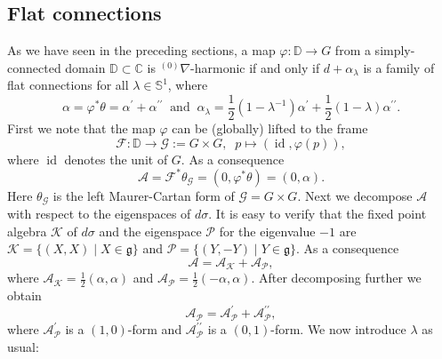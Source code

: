 \documentclass[12pt]{amsart}
\theoremstyle{definition}
\theoremstyle{remark}
\numberwithin{equation}{section}
\begin{document}
\subsection{Flat connections}
 As we have seen in the preceding sections, a map 
 $\varphi : \mathbb D  \to G$ from a simply-connected 
 domain  $\mathbb D \subset \mathbb C$ is ${{}^{(0)}\nabla}$-harmonic 
 if and only if $d + \alpha_{\lambda}$ is a family of 
 flat connections for all $\lambda \in \mathbb S^1$, 
 where 
\begin{equation}\label{eq:alphalambda}
 \alpha =\varphi^{*}\theta  = \alpha^{\prime} + \alpha^{\prime \prime}\;\; \mbox{and} \;\;
 \alpha_{\lambda} = \frac{1}{2}(1- \lambda^{-1}) \alpha^{\prime}+ 
 \frac{1}{2}(1- \lambda) \alpha^{\prime \prime}.
\end{equation}
 First we note that the map $\varphi$ can be (globally) lifted to the frame 
\begin{equation*}
 \mathcal F : \mathbb D \to {\mathcal G}:=G \times G, 
 \;\; p \mapsto ({\operatorname{id}}, \varphi(p)),
\end{equation*}
 where ${\operatorname{id}}$ denotes the unit of $G$.
 As a consequence 
\begin{equation}\label{eq:doubleMC}
 \mathcal A =\mathcal F^{*}\theta_{\mathcal{G}}  = 
 (0,  \varphi^{*}\theta)  = ( 0, \alpha).
\end{equation}
 Here $\theta_{\mathcal G}$ is the left Maurer-Cartan 
 form of $\mathcal{G}=G\times{G}$.
 Next we decompose $\mathcal A$ with respect to the eigenspaces
 of $d \sigma$. It is easy to verify that the fixed point algebra $\mathcal K$ 
 of $d \sigma$ and the eigenspace $\mathcal P$ 
 for the eigenvalue $-1$ are 
 ${\mathcal K} = \{(X, X)\;|\; X \in \mathfrak g\}$ and 
 ${\mathcal P} = \{(Y, -Y)\;|\; Y \in \mathfrak g\}$.
 As a consequence 
\begin{equation*}
 {\mathcal A} = {\mathcal A}_{\mathcal K} +  {\mathcal A}_{\mathcal P},
\end{equation*}
 where ${\mathcal A}_{\mathcal K}= \tfrac{1}{2}(\alpha, \alpha)$
 and ${\mathcal A}_{\mathcal P} = \tfrac{1}{2}(-\alpha, \alpha)$.
 After decomposing further we obtain
\begin{equation*}
 {\mathcal A}_{\mathcal P} 
 = {\mathcal A}_{\mathcal P}^{\prime} + {\mathcal A}_{\mathcal P}^{\prime \prime},
\end{equation*}
 where ${\mathcal A}_{\mathcal P}^{\prime}$ is a $(1, 0)$-form and 
 ${\mathcal A}_{\mathcal P}^{\prime \prime}$ is a $(0, 1)$-form.
 We now introduce $\lambda$ as usual:
\end{document}
